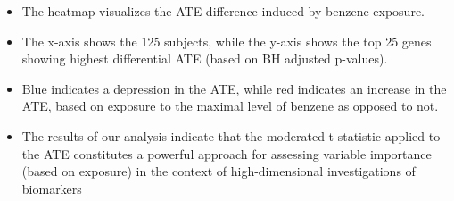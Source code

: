 \documentclass[landscape,a0paper,fontscale=0.285]{baposter} %
\newcommand{\compresslist}{ %
\setlength{\itemsep}{1pt}
\setlength{\parskip}{0pt}
\setlength{\parsep}{0pt}
}
\newcommand{\1}{\mathbbm{1}}
\begin{document}
\begin{poster}
{\begin{multicols}{2}

\begin{itemize}\compresslist
  \item The heatmap visualizes the ATE difference induced by benzene exposure.
  \item The x-axis shows the 125 subjects, while the y-axis shows the top 25
    genes showing highest differential ATE (based on BH adjusted p-values).
  \item Blue indicates a depression in the ATE, while red indicates an increase
    in the ATE, based on exposure to the maximal level of benzene as opposed to
    not.
  \item The results of our analysis indicate that the moderated t-statistic
    applied to the ATE constitutes a powerful approach for assessing variable
    importance (based on exposure) in the context of high-dimensional
    investigations of biomarkers
\end{itemize}

\end{multicols}
}


\end{poster}
\end{document}
